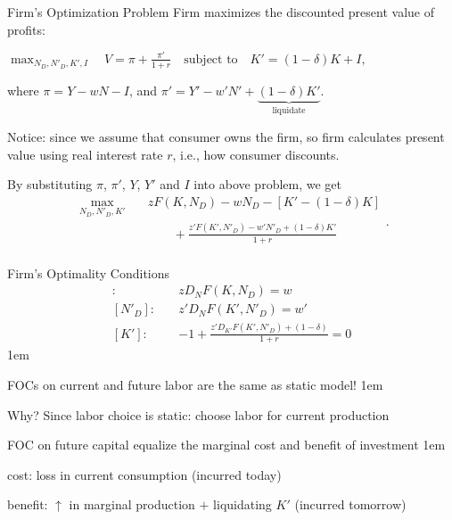 \documentclass[11pt,aspectratio=43]{beamer}
\let\olditemize=\itemize
\let\endolditemize=\enditemize
\renewenvironment{itemize}{\olditemize \itemsep1em}{\endolditemize}
\theoremstyle{definition}
\begin{document}
\begin{frame}{Firm's Optimization Problem}
\label{slide:Firm_s_Optimization_Problem}
    Firm maximizes the discounted present value of profits:
    \begin{center}
        $ \displaystyle \max_{N_{D}, N'_{D}, K', I} \quad V = \pi + \frac{\pi' }{1+r} \quad \text{subject to} \quad K' = ( 1-\delta )K + I,$
    \end{center}
    where $ \pi = Y - wN - I $, and $ \pi' = Y' - w'N' + \underbrace{( 1-\delta )K'}_{\text{liquidate}} $.

    Notice: since we assume that \alert{consumer owns the firm}, so firm calculates present value using \alert{real interest rate $ r $}, i.e., how consumer discounts.

    By substituting $ \pi $, $ \pi' $, $ Y $, $ Y' $ and $ I $ into above problem, we get
    \begin{equation}
    \label{eq:firm_problem}
        \begin{split}
            \max_{N_{D}, N'_{D}, K'} \quad
                & z F( K, N_{D} ) - w N_{D} - [ K' - ( 1-\delta )K ]
            \\
                & \qquad + \frac{z' F( K', N'_{D} ) - w' N'_{D} + ( 1-\delta ) K'}{1+r}
            \\
        \end{split}
    .\end{equation}
\end{frame}

\begin{frame}{Firm's Optimality Conditions}
\label{slide:Firm_s_Optimality_Conditions}
    \begin{align*}
        [ N_{D} ]: \quad
            & z D_{N}F( K, N_{D} ) = w
        \\
        [ N'_{D} ]: \quad
            & z' D_{N}F( K', N'_{D} ) = w'
        \\
        [ K' ]: \quad
            & -1 + \frac{z' D_{K'} F( K', N'_{D} ) + (1-\delta)}{1+r} = 0
    \end{align*}
    \begin{itemize}
        \item FOCs on current and future labor are \alert{the same} as static model!
        \begin{itemize}
            \item Why? Since labor choice is \alert{static}: choose labor for \alert{current} production
        \end{itemize}
        \item FOC on future capital equalize the \alert{marginal cost and benefit} of investment
        \begin{itemize}
            \item cost: loss in current consumption (incurred today)
            \item benefit: $ \uparrow  $ in marginal production $ + $ liquidating $ K' $ (incurred tomorrow)
        \end{itemize}
    \end{itemize}
\end{frame}
\end{document}
